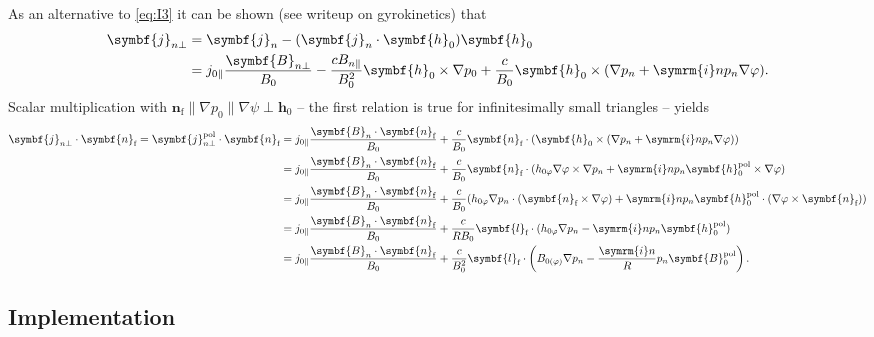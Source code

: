 \documentclass[a4paper, 10pt, english]{article}
\let\temp\vartheta
\let\vartheta\theta
\let\theta\temp
\let\temp\varphi
\let\varphi\phi
\let\phi\temp
\let\vec\symbf
\newcommand*\im{\ensuremath{\symrm{i}}}  %
\newcommand*\pol{\ensuremath{\textrm{pol}}}  %
\newcommand*\fs{\ensuremath{\textrm{f}}}  %
\begin{document}
As an alternative to \cref{eq:I3} it can be shown (see writeup on gyrokinetics) that
\begin{align}
  \vec{j}_{n \perp} &= \vec{j}_{n} - (\vec{j}_{n} \cdot \vec{h}_{0}) \vec{h}_{0} \nonumber \\
  &= j_{0 \parallel} \frac{\vec{B}_{n \perp}}{B_{0}} - \frac{c B_{n \parallel}}{B_{0}^{2}} \vec{h}_{0} \times \nabla p_{0} + \frac{c}{B_{0}} \vec{h}_{0} \times (\nabla p_{n} + \im n p_{n} \nabla \phi).
\end{align}
Scalar multiplication with $\vec{n}_{\fs} \parallel \nabla p_{0} \parallel \nabla \psi \perp \vec{h}_{0}$ -- the first relation is true for infinitesimally small triangles -- yields
\begin{align}
  \vec{j}_{n \perp} \cdot \vec{n}_{\fs} = \vec{j}_{n \perp}^{\pol} \cdot \vec{n}_{\fs} &= j_{0 \parallel} \frac{\vec{B}_{n} \cdot \vec{n}_{\fs}}{B_{0}} + \frac{c}{B_{0}} \vec{n}_{\fs} \cdot (\vec{h}_{0} \times (\nabla p_{n} + \im n p_{n} \nabla \phi)) \nonumber \\
  &= j_{0 \parallel} \frac{\vec{B}_{n} \cdot \vec{n}_{\fs}}{B_{0}} + \frac{c}{B_{0}} \vec{n}_{\fs} \cdot (h_{0 \phi} \nabla \phi \times \nabla p_{n} + \im n p_{n} \vec{h}_{0}^{\pol} \times \nabla \phi) \nonumber \\
  &= j_{0 \parallel} \frac{\vec{B}_{n} \cdot \vec{n}_{\fs}}{B_{0}} + \frac{c}{B_{0}} (h_{0 \phi} \nabla p_{n} \cdot (\vec{n}_{\fs} \times \nabla \phi) + \im n p_{n} \vec{h}_{0}^{\pol} \cdot (\nabla \phi \times \vec{n}_{\fs})) \nonumber \\
  &= j_{0 \parallel} \frac{\vec{B}_{n} \cdot \vec{n}_{\fs}}{B_{0}} + \frac{c}{R B_{0}} \vec{l}_{\fs} \cdot (h_{0 \phi} \nabla p_{n} - \im n p_{n} \vec{h}_{0}^{\pol}) \nonumber \\
  &= j_{0 \parallel} \frac{\vec{B}_{n} \cdot \vec{n}_{\fs}}{B_{0}} + \frac{c}{B_{0}^{2}} \vec{l}_{\fs} \cdot \left( B_{0 (\phi)} \nabla p_{n} - \frac{\im n}{R} p_{n} \vec{B}_{0}^{\pol} \right). \label{eq:I3_alt}
\end{align}

\subsection{Implementation}
\end{document}
